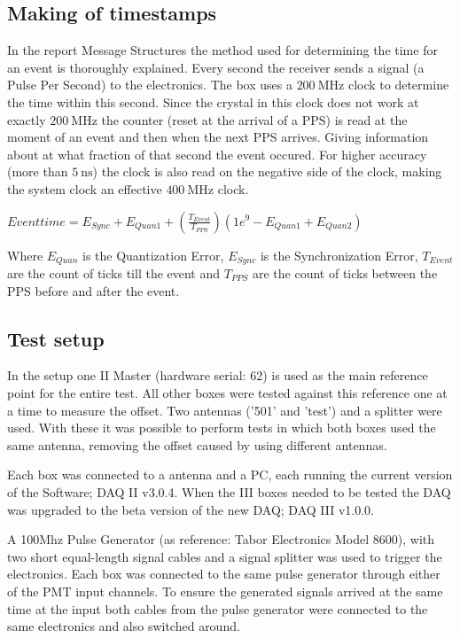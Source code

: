 \subsection{Making of timestamps}
\label{sub:gps_timestamps}

In the report Message Structures \hisparc the method used for
determining the time for an event is thoroughly explained. Every second
the \gps receiver sends a signal (a Pulse Per Second) to the \hisparc
electronics. The \hisparc box uses a $\SI{200}{\mega\hertz}$ clock to
determine the time within this second. Since the crystal in this clock
does not work at exactly $\SI{200}{\mega\hertz}$ the counter (reset at
the arrival of a PPS) is read at the moment of an event and then when
the next PPS arrives. Giving information about at what fraction of that
second the event occured. For higher accuracy (more than
$\SI{5}{\nano\second}$) the clock is also read on the negative side of
the clock, making the system clock an effective
$\SI{400}{\mega\hertz}$ clock.

$Event time = E_{Sync} + E_{Quan1} + (\frac{T_{Event}}{T_{PPS}}) (1e^9 -
E_{Quan1} + E_{Quan2})$

Where $E_{Quan}$ is the Quantization Error, $E_{Sync}$ is the
Synchronization Error, $T_{Event}$ are the count of ticks till the event
and $T_{PPS}$ are the count of ticks between the PPS before and after
the event.


\subsection{Test setup}
\label{sub:gps_test_setup}

In the setup one \hisparc II Master (hardware serial: 62) is used as the
main reference point for the entire test. All other \hisparc boxes were
tested against this reference one at a time to measure the offset. Two
\gps antennas ('501' and 'test') and a \gps splitter were used. With
these it was possible to perform tests in which both \hisparc boxes used
the same \gps antenna, removing the offset caused by using different
\gps antennas.

Each \hisparc box was connected to a \gps antenna and a PC, each running
the current version of the \hisparc Software; \hisparc DAQ II v3.0.4.
When the \hisparc III boxes needed to be tested the DAQ was upgraded to
the beta version of the new DAQ; \hisparc DAQ III v1.0.0.

A 100Mhz Pulse Generator (as reference: Tabor Electronics Model 8600),
with two short equal-length signal cables and a signal splitter was used
to trigger the \hisparc electronics. Each box was connected to the same
pulse generator through either of the PMT input channels. To ensure the
generated signals arrived at the same time at the input both cables from
the pulse generator were connected to the same \hisparc electronics and
also switched around.

